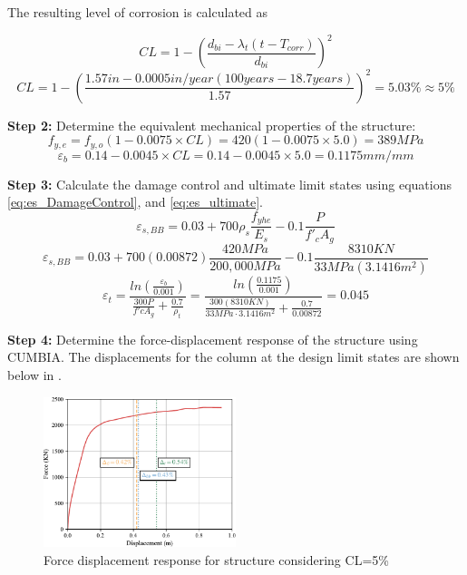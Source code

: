 The resulting level of corrosion is calculated as

\begin{displaymath}
    CL=1-\left(\frac{d_{bi}-\lambda_{t}(t-T_{corr})}{d_{bi}}\right)^2
\end{displaymath}
\begin{displaymath}
    CL= 1-\left(\frac{1.57 in -0.0005 in/year (100 years -18.7 years)}{1.57}\right)^2=5.03\% \approx 5\%
\end{displaymath}

\textbf{Step 2:} Determine the equivalent mechanical properties of the structure:
\begin{displaymath}
    f_{y,e}=f_{y,o}(1-0.0075\times CL)=420(1-0.0075\times 5.0)=389 MPa
\end{displaymath}
\begin{displaymath}
    \varepsilon_{b}=0.14-0.0045 \times CL = 0.14-0.0045 \times 5.0 = 0.1175 mm/mm
\end{displaymath}

\textbf{Step 3:} Calculate the damage control and ultimate limit states using equations \ref{eq:es_DamageControl}, and \ref{eq:es_ultimate}.
\begin{displaymath}
    \varepsilon_{s,BB}=0.03+700\rho_{s}  \frac{f_{yhe}}{E_{s}} -0.1\frac{P}{f'_{c}A_{g}}
\end{displaymath}
\begin{displaymath}
    \varepsilon_{s,BB}=0.03+700 (0.00872)  \frac{420 MPa}{200,000 MPa} -0.1\frac{8310 KN}{33MPa (3.1416 m^2)}
\end{displaymath}
\begin{displaymath}
    \varepsilon_{t}=\frac{ln(\frac{\varepsilon_{b}}{0.001})}{\frac{300P}{f'c A_{g}}+\frac{0.7}{\rho_{t}}}=\frac{ln(\frac{0.1175}{0.001})}{\frac{300(8310KN)}{33MPa \cdot 3.1416 m^2}+\frac{0.7}{0.00872}}=0.045
\end{displaymath}

\textbf{Step 4:} Determine the force-displacement response of the structure using CUMBIA. The displacements for the column at the design limit states are shown below in . 

\begin{figure}[htbp]
	\centering
	\includegraphics[width=0.5\textwidth]{VAC Thesis 2.0/Chapter-6/figs/Force_Displacement_Design_5.pdf}
	\caption{Force displacement response for structure considering CL=5\% }
	\label{fig:force_displacement_design}
\end{figure}

